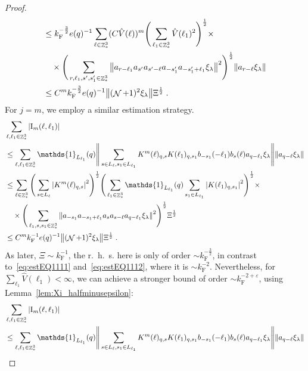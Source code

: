 \documentclass[12pt,a4paper]{article}
\numberwithin{equation}{section}
\newcommand{\1}{\mathbb{I}}
\newcommand{\F}{\mathrm{F}}
\newcommand{\I}{\mathrm{I}}
\DeclareMathOperator{\Z}{\mathbb{Z}}
\DeclareMathOperator{\NN}{\mathcal{N}}
\newcommand{\half}{\frac{1}{2}}
\theoremstyle{plain}
\theoremstyle{definition}
\theoremstyle{remark}
\theoremstyle{plain}
\theoremstyle{definition}
\theoremstyle{remark}
\begin{document}
\begin{proof}
{\begin{align}
	&\leq k_{\F}^{-\frac 32} e(q)^{-1}
		\sum_{\ell \in \Z^3_*} (C \hat{V}(\ell))^m
		\Bigg( \sum_{\ell_1 \in \Z^3_*} \hat{V}(\ell_1)^2 \Bigg)^{\half} \times \nonumber\\
	&\quad \times \Bigg( \sum\limits_{r,\ell_1,s',s_1' \in \Z^3_*} \norm{a_{r-\ell_1} a_{s'} a_{s'-\ell} a_{-s_1'} a_{-s_1'+\ell_1} \xi_\lambda}^2 \Bigg)^\half
		\norm{a_{r-\ell} \xi_\lambda } \nonumber\\
	&\leq C^m k_{\F}^{-\frac 32} e(q)^{-1}
		\norm{(\NN+1)^2 \xi_\lambda} \Xi^\half \;. \label{eq:estEQ1112}
\end{align}
}
For $ j = m $, we employ a similar estimation strategy.
\textcolor{green!30!black}{
\begin{align}
	& \sum_{\ell,\ell_1 \in \Z^3_*} |\I_m(\ell, \ell_1)| \nonumber\\
	&\leq \sum_{\ell,\ell_1 \in \Z^3_*} \mathds{1}_{L_{\ell_1}}(q)
		\Bigg\Vert \sum\limits_{s\in L_{\ell}, s_1 \in L_{\ell_1}} K^m(\ell)_{q,s}K(\ell_1)_{q,s_1} b_{-s_1}(-\ell_1) b_{s}(\ell) a_{q-\ell_1}\xi_\lambda \Bigg\Vert
		\norm{ a_{q-\ell}\xi_\lambda }\nonumber\\
	&\leq \sum_{\ell \in \Z^3_*} \Bigg(\sum\limits_{s \in L_{\ell}} \abs{K^m(\ell)_{q,s}}^2\Bigg)^\half 
		\Bigg(\sum_{\ell_1 \in \Z^3_*} \mathds{1}_{L_{\ell_1}}(q) \sum\limits_{s_1 \in L_{\ell_1}} \abs{K(\ell_1)_{q,s_1}}^2\Bigg)^\half \times \nonumber\\
	&\quad \times \Bigg( \sum_{\ell_1, s, s_1 \in \Z^3_*} \norm{ a_{-s_1} a_{-s_1+\ell_1} a_s a_{s-\ell} a_{q-\ell_1} \xi_\lambda}^2 \Bigg)^{\half} \Xi^\half \nonumber\\
	&\leq C^m k_{\F}^{-1} e(q)^{-1} \norm{ (\NN+1)^2 \xi_\lambda}\Xi^\half \;. \label{eq:estEQ1113_Coulomb}
\end{align}
As later, $ \Xi \sim k_{\F}^{-1} $, the r.~h.~s. here is only of order $ \sim k_{\F}^{-\frac 32} $, in contrast to~\eqref{eq:estEQ1111} and~\eqref{eq:estEQ1112}, where it is $ \sim k_{\F}^{-2} $. Nevertheless, for $ \sum_{\ell_1} \hat{V}(\ell_1) < \infty $, we can achieve a stronger bound of order $ \sim k_{\F}^{-2 + \varepsilon} $, using Lemma~\ref{lem:Xi_halfminusepsilon}:
\begin{align}
	&\sum_{\ell,\ell_1 \in \Z^3_*} |\I_m(\ell, \ell_1)|\nonumber\\
	&\leq \sum_{\ell,\ell_1 \in \Z^3_*} \mathds{1}_{L_{\ell_1}}(q)
		\Bigg\Vert \sum\limits_{s\in L_{\ell}, s_1 \in L_{\ell_1}} K^m(\ell)_{q,s}K(\ell_1)_{q,s_1} b_{-s_1}(-\ell_1) b_{s}(\ell) a_{q-\ell_1}\xi_\lambda \Bigg\Vert
		\norm{ a_{q-\ell}\xi_\lambda }\nonumber\\

\end{align}}
\end{proof}
\end{document}
